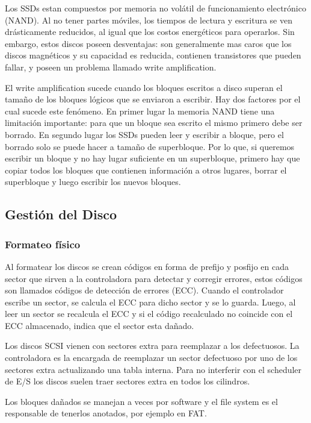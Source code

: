 \documentclass{article}
\begin{document}
Los SSDs estan compuestos por memoria no volátil de funcionamiento electrónico (NAND). Al no tener partes móviles, los tiempos de lectura y escritura se ven drásticamente reducidos, al igual que los costos energéticos para operarlos. Sin embargo, estos discos poseen desventajas: son generalmente mas caros que los discos magnéticos y su capacidad es reducida, contienen transistores que pueden fallar, y poseen un problema llamado write amplification. 

El write amplification sucede cuando los bloques escritos a disco superan el tamaño de los bloques lógicos que se enviaron a escribir. Hay dos factores por el cual sucede este fenómeno. En primer lugar la memoria NAND tiene una limitación importante: para que un bloque sea escrito el mismo primero debe ser borrado. En segundo lugar los SSDs pueden leer y escribir a bloque, pero el borrado solo se puede hacer a tamaño de superbloque. Por lo que, si queremos escribir un bloque y no hay lugar suficiente en un superbloque, primero hay que copiar todos los bloques que contienen información a otros lugares, borrar el superbloque y luego escribir los nuevos bloques.

\subsection{Gesti\'on del Disco}

\subsubsection{Formateo f\'isico}

Al formatear los discos se crean c\'odigos en forma de prefijo y posfijo en cada sector que sirven a la controladora para detectar y corregir errores, estos códigos son llamados códigos de detección de errores (ECC). Cuando el controlador escribe un sector, se calcula el ECC para dicho sector y se lo guarda. Luego, al leer un sector se recalcula el ECC y si el código recalculado no coincide con el ECC almacenado, indica que el sector esta dañado.

Los discos SCSI vienen con sectores extra para reemplazar a los defectuosos. La controladora es la encargada de reemplazar un sector defectuoso por uno de los sectores extra actualizando una tabla interna. Para no interferir con el scheduler de E/S los discos suelen traer sectores extra en todos los cilindros.

Los bloques da\~nados se manejan a veces por software y el file system es el responsable de tenerlos anotados, por ejemplo en FAT.
\end{document}
